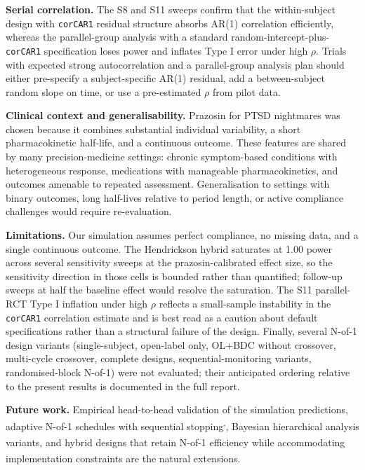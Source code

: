 \documentclass[
  11pt,
]{article}
\begin{document}
\textbf{Serial correlation.} The S8 and S11 sweeps confirm that the
within-subject design with \texttt{corCAR1} residual structure absorbs
AR(1) correlation efficiently, whereas the parallel-group analysis with
a standard random-intercept-plus-\texttt{corCAR1} specification loses
power and inflates Type I error under high \(\rho\). Trials with
expected strong autocorrelation and a parallel-group analysis plan
should either pre-specify a subject-specific AR(1) residual, add a
between-subject random slope on time, or use a pre-estimated \(\rho\)
from pilot data.

\textbf{Clinical context and generalisability.} Prazosin for PTSD
nightmares was chosen because it combines substantial individual
variability, a short pharmacokinetic half-life, and a continuous
outcome. These features are shared by many precision-medicine settings:
chronic symptom-based conditions with heterogeneous response,
medications with manageable pharmacokinetics, and outcomes amenable to
repeated assessment. Generalisation to settings with binary outcomes,
long half-lives relative to period length, or active compliance
challenges would require re-evaluation.

\textbf{Limitations.} Our simulation assumes perfect compliance, no
missing data, and a single continuous outcome. The Hendrickson hybrid
saturates at 1.00 power across several sensitivity sweeps at the
prazosin-calibrated effect size, so the sensitivity direction in those
cells is bounded rather than quantified; follow-up sweeps at half the
baseline effect would resolve the saturation. The S11 parallel-RCT Type
I inflation under high \(\rho\) reflects a small-sample instability in
the \texttt{corCAR1} correlation estimate and is best read as a caution
about default specifications rather than a structural failure of the
design. Finally, several N-of-1 design variants (single-subject,
open-label only, OL+BDC without crossover, multi-cycle crossover,
complete designs, sequential-monitoring variants, randomised-block
N-of-1) were not evaluated; their anticipated ordering relative to the
present results is documented in the full report.

\textbf{Future work.} Empirical head-to-head validation of the
simulation predictions, adaptive N-of-1 schedules with sequential
stopping\textsuperscript{,},
Bayesian hierarchical analysis
variants\textsuperscript{},
and hybrid designs that retain N-of-1 efficiency while accommodating
implementation
constraints\textsuperscript{}
are the natural extensions.
\end{document}
